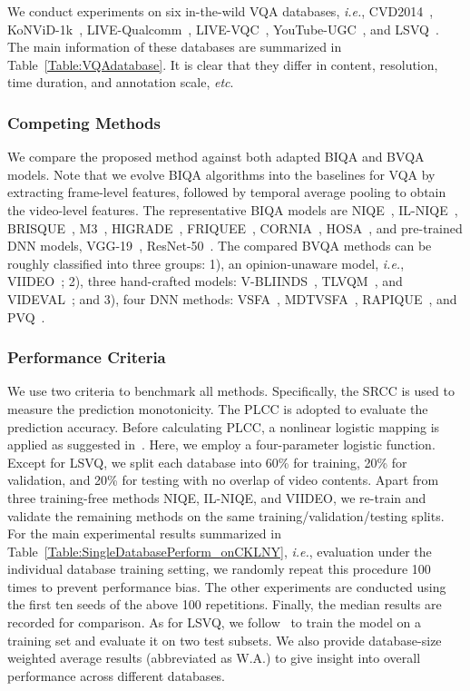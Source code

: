 \documentclass[journal]{IEEEtran}
\begin{document}
{{We conduct experiments on six in-the-wild VQA databases, \textit{i.e.}, CVD2014~\cite{nuutinen2016cvd2014}, KoNViD-1k~\cite{hosu2017konstanz}, LIVE-Qualcomm~\cite{ghadiyaram2018capture}, LIVE-VQC~\cite{sinno2019large}, YouTube-UGC~\cite{wang2019youtube}, and LSVQ~\cite{ying2021patch}. The main information of these databases are summarized in Table~\ref{Table:VQAdatabase}. It is clear that they differ in content, resolution, time duration, and annotation scale, \textit{etc}.

\subsubsection{Competing Methods}\label{subsec:ComparedAlgs}
We compare the proposed method against both adapted BIQA and BVQA models. Note that we evolve BIQA algorithms into the baselines for VQA by extracting frame-level features, followed by temporal average pooling to obtain the video-level features. The representative BIQA models are NIQE~\cite{mittal2013making}, IL-NIQE~\cite{zhang2015feature}, BRISQUE~\cite{mittal2012no}, M3~\cite{xue2014blind}, HIGRADE~\cite{kundu2017no}, FRIQUEE~\cite{ghadiyaram2017perceptual}, CORNIA~\cite{ye2012unsupervised}, HOSA~\cite{xu2016blind}, and pre-trained DNN models, VGG-19~\cite{simonyan2014very}, ResNet-50~\cite{he2016deep}. The compared BVQA methods can be roughly classified into three groups: 1), an opinion-unaware model, \textit{i.e.}, VIIDEO~\cite{mittal2016completely}; 2), three hand-crafted models: V-BLIINDS~\cite{saad2014blind}, TLVQM~\cite{korhonen2019two}, and VIDEVAL~\cite{tu2021ugc}; and 3), four DNN methods: VSFA~\cite{li2019quality}, MDTVSFA~\cite{li2021unified}, RAPIQUE~\cite{tu2021rapique}, and PVQ~\cite{ying2021patch}.

\subsubsection{Performance Criteria}\label{subsec:Criteria}
We use two criteria to benchmark all methods. Specifically, the SRCC is used to measure the prediction monotonicity. The PLCC is adopted to evaluate the prediction accuracy. Before calculating PLCC, a nonlinear logistic mapping is applied as suggested in~\cite{video2000final}. Here, we employ a four-parameter logistic function. Except for LSVQ, we split each database into 60\% for training, 20\% for validation, and 20\% for testing with no overlap of video contents. Apart from three training-free methods NIQE, IL-NIQE, and VIIDEO, we re-train and validate the remaining methods on the same training/validation/testing splits. For the main experimental results summarized in Table~\ref{Table:SingleDatabasePerform_onCKLNY}, \textit{i.e.}, evaluation under the individual database training setting, we randomly repeat this procedure 100 times to prevent performance bias. The other experiments are conducted using the first ten seeds of the above 100 repetitions. Finally, the median results are recorded for comparison. As for LSVQ, we follow~\cite{ying2021patch} to train the model on a training set and evaluate it on two test subsets. We also provide database-size weighted average results (abbreviated as W.A.) to give insight into overall performance across different databases.

}}
\end{document}
